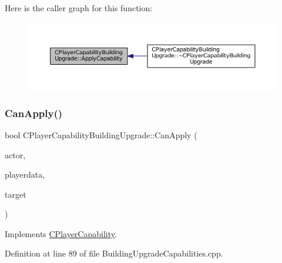 Here is the caller graph for this function\+:\nopagebreak
\begin{figure}[H]
\begin{center}
\leavevmode
\includegraphics[width=350pt]{classCPlayerCapabilityBuildingUpgrade_a5e71446b74307f31ce6d6e9bbfd9a681_icgraph}
\end{center}
\end{figure}
\hypertarget{classCPlayerCapabilityBuildingUpgrade_a22de7902bcf6406a3b3a7c51e5c56f35}{}\label{classCPlayerCapabilityBuildingUpgrade_a22de7902bcf6406a3b3a7c51e5c56f35} 
\subsubsection{\texorpdfstring{Can\+Apply()}{CanApply()}}
{\footnotesize\ttfamily bool C\+Player\+Capability\+Building\+Upgrade\+::\+Can\+Apply (\begin{DoxyParamCaption}\item[{std\+::shared\+\_\+ptr$<$ \hyperlink{classCPlayerAsset}{C\+Player\+Asset} $>$}]{actor,  }\item[{std\+::shared\+\_\+ptr$<$ \hyperlink{classCPlayerData}{C\+Player\+Data} $>$}]{playerdata,  }\item[{std\+::shared\+\_\+ptr$<$ \hyperlink{classCPlayerAsset}{C\+Player\+Asset} $>$}]{target }\end{DoxyParamCaption})\hspace{0.3cm}{\ttfamily [virtual]}}



Implements \hyperlink{classCPlayerCapability_ae96263e0950f496492f8baeb877b9554}{C\+Player\+Capability}.



Definition at line 89 of file Building\+Upgrade\+Capabilities.\+cpp.


